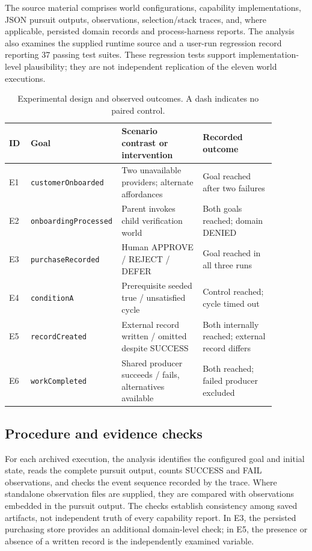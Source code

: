 \documentclass[11pt]{article}
\begin{document}
The source material comprises world configurations, capability implementations, JSON pursuit outputs, observations, selection/stack traces, and, where applicable, persisted domain records and process-harness reports. The analysis also examines the supplied runtime source and a user-run regression record reporting 37 passing test suites. These regression tests support implementation-level plausibility; they are not independent replication of the eleven world executions.

\begin{table}[ht]
\centering\small
\caption{Experimental design and observed outcomes. A dash indicates no paired control.}
\label{tab:design}
\begin{tabular}{@{}p{0.08\linewidth}p{0.23\linewidth}p{0.30\linewidth}p{0.27\linewidth}@{}}
\toprule
ID & Goal & Scenario contrast or intervention & Recorded outcome \\
\midrule
E1 & \texttt{customerOnboarded} & Two unavailable providers; alternate affordances & Goal reached after two failures \\
E2 & \texttt{onboardingProcessed} & Parent invokes child verification world & Both goals reached; domain DENIED \\
E3 & \texttt{purchaseRecorded} & Human APPROVE / REJECT / DEFER & Goal reached in all three runs \\
E4 & \texttt{conditionA} & Prerequisite seeded true / unsatisfied cycle & Control reached; cycle timed out \\
E5 & \texttt{recordCreated} & External record written / omitted despite SUCCESS & Both internally reached; external record differs \\
E6 & \texttt{workCompleted} & Shared producer succeeds / fails, alternatives available & Both reached; failed producer excluded \\
\bottomrule
\end{tabular}
\end{table}

\subsection{Procedure and evidence checks}
For each archived execution, the analysis identifies the configured goal and initial state, reads the complete pursuit output, counts SUCCESS and FAIL observations, and checks the event sequence recorded by the trace. Where standalone observation files are supplied, they are compared with observations embedded in the pursuit output. The checks establish consistency among saved artifacts, not independent truth of every capability report. In E3, the persisted purchasing store provides an additional domain-level check; in E5, the presence or absence of a written record is the independently examined variable.
\end{document}

